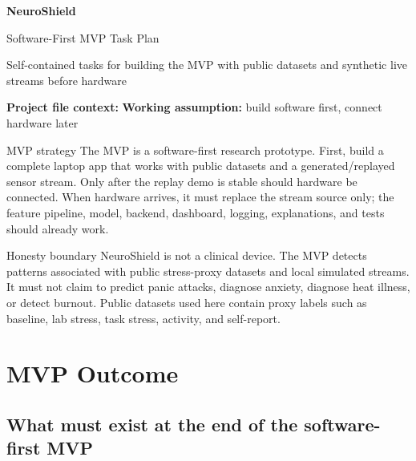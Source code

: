\documentclass[11pt,a4paper]{article}
\newcommand{\code}{\path}
\begin{document}
\thispagestyle{empty}

\begin{tcolorbox}[colback=nsblue,colframe=nsblue,arc=3pt,boxrule=0pt,
  left=16pt,right=16pt,top=16pt,bottom=16pt]
{\sffamily\color{white}\fontsize{27}{31}\selectfont\bfseries NeuroShield}\par
\vspace{4pt}
{\sffamily\color{white}\LARGE Software-First MVP Task Plan}\par
\vspace{8pt}
{\sffamily\color{white!90}\large Self-contained tasks for building the MVP with public datasets and synthetic live streams before hardware}
\end{tcolorbox}

\vspace{8pt}
\textbf{Project file context:} \code{manika/initial_research.tex}\hfill
\textbf{Working assumption:} build software first, connect hardware later

\begin{plainbox}{MVP strategy}
The MVP is a software-first research prototype. First, build a complete laptop app that works with
public datasets and a generated/replayed sensor stream. Only after the replay demo is stable should
hardware be connected. When hardware arrives, it must replace the stream source only; the feature
pipeline, model, backend, dashboard, logging, explanations, and tests should already work.
\end{plainbox}

\begin{warningbox}{Honesty boundary}
NeuroShield is not a clinical device. The MVP detects patterns associated with public stress-proxy
datasets and local simulated streams. It must not claim to predict panic attacks, diagnose anxiety,
diagnose heat illness, or detect burnout. Public datasets used here contain proxy labels such as
baseline, lab stress, task stress, activity, and self-report.
\end{warningbox}

\tableofcontents
\newpage

\section{MVP Outcome}

\subsection{What must exist at the end of the software-first MVP}
\end{document}

